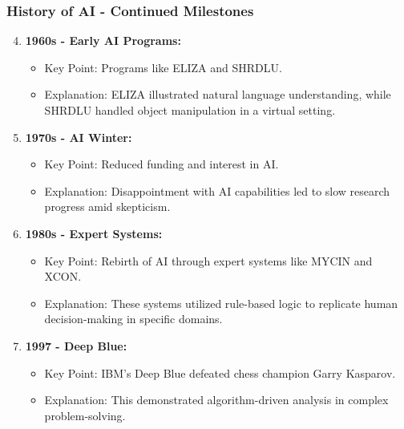 \documentclass[aspectratio=169]{beamer}
\begin{document}
\begin{frame}[fragile]
    \frametitle{History of AI - Continued Milestones}
    \begin{enumerate}
        \setcounter{enumi}{3} %
        \item {\bf 1960s - Early AI Programs:}
        \begin{itemize}
            \item Key Point: Programs like ELIZA and SHRDLU.
            \item Explanation: ELIZA illustrated natural language understanding, while SHRDLU handled object manipulation in a virtual setting.
        \end{itemize}

        \item {\bf 1970s - AI Winter:}
        \begin{itemize}
            \item Key Point: Reduced funding and interest in AI.
            \item Explanation: Disappointment with AI capabilities led to slow research progress amid skepticism.
        \end{itemize}

        \item {\bf 1980s - Expert Systems:}
        \begin{itemize}
            \item Key Point: Rebirth of AI through expert systems like MYCIN and XCON.
            \item Explanation: These systems utilized rule-based logic to replicate human decision-making in specific domains.
        \end{itemize}

        \item {\bf 1997 - Deep Blue:}
        \begin{itemize}
            \item Key Point: IBM's Deep Blue defeated chess champion Garry Kasparov.
            \item Explanation: This demonstrated algorithm-driven analysis in complex problem-solving.
        \end{itemize}
    \end{enumerate}
\end{frame}
\end{document}
